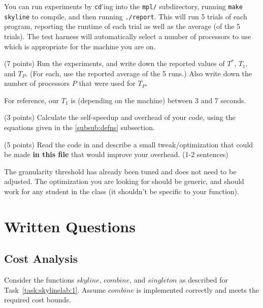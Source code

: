 You can run experiments by \texttt{cd}'ing into the \texttt{mpl/} subdirectory,
running \texttt{make skyline} to compile, and then running \texttt{./report}. This will
run 5 trials of each program, reporting the runtime of each trial as well as the
average (of the 5 trials). The test harness will automatically select a number
of processors to use which is appropriate for the machine you are on.

\begin{flex}
\begin{task}[4]
(7 points)
Run the experiments, and write down the reported values of $T^*$, $T_1$, and
$T_P$. (For each, use the reported average of the 5 runs.) Also write down the
number of processors $P$ that were used for $T_P$.
\end{task}

\begin{note}
For reference, our $T_1$ is (depending on the machine) between 3 and 7 seconds.
\end{note}
\end{flex}

\begin{task}[5]
(3 points)
Calculate the self-speedup and overhead of your code, using the equations
given in the \ref{subsub:defns} subsection.
\end{task}

\begin{task}[6]
(5 points)
Read the code in  and describe a small
tweak/optimization that could be made \textbf{in this file} that would improve
your overhead. (1-2 sentences)
\end{task}

\begin{note}
The granularity threshold has already been tuned and does not need to be adjusted.
The optimization you are looking for should be generic, and should work for any
student in the class (it shouldn't be specific to your  function).
\end{note}

\section{Written Questions}

\subsection{Cost Analysis}

Consider the functions $\mathit{skyline}$, $\mathit{combine}$, and $\mathit{singleton}$ as
described for Task~\ref{task:skylinelab:1}. Assume $\mathit{combine}$ is
implemented correctly and meets the required cost bounds.

